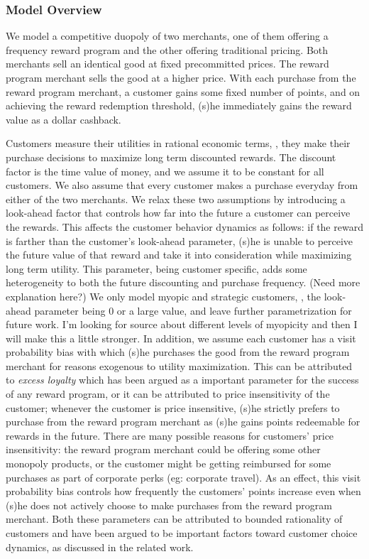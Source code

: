 \subsubsection{Model Overview}
We model a competitive duopoly of two merchants, one of them offering a frequency reward program and the other offering traditional pricing.
Both merchants sell an identical good at fixed precommitted prices.
The reward program merchant sells the good at a higher price.
With each purchase from the reward program merchant, a customer gains some fixed number of points, and on achieving the reward redemption threshold, (s)he immediately gains the reward value as a dollar cashback.

Customers measure their utilities in rational economic terms, \ie, they make their purchase decisions to maximize long term discounted rewards.
The discount factor is the time value of money, and we assume it to be constant for all customers.
We also assume that every customer makes a purchase everyday from either of the two merchants.
We relax these two assumptions by introducing a look-ahead factor that controls how far into the future a customer can perceive the rewards. 
This affects the customer behavior dynamics as follows: if the reward is farther than the customer's look-ahead parameter, (s)he is unable to perceive the future value of that reward and take it into consideration while maximizing long term utility.
{\arpit This parameter, being customer specific, adds some heterogeneity to both the future discounting and purchase frequency. (Need more explanation here?)}
We only model myopic and strategic customers, \ie, the look-ahead parameter being $0$ or a large value, and leave further parametrization for future work. {\nolan I'm looking for source about different levels of myopicity and then I will make this a little stronger.}
In addition, we assume each customer has a visit probability bias with which (s)he purchases the good from the reward program merchant for reasons exogenous to utility maximization.
This can be attributed to \emph{excess loyalty} which has been argued as a important parameter for the success of any reward program, or it can be attributed to price insensitivity of the customer; whenever the customer is price insensitive, (s)he strictly prefers to purchase from the reward program merchant as (s)he gains points redeemable for rewards in the future.
There are many possible reasons for customers' price insensitivity: the reward program merchant could be offering some other monopoly products, or the customer might be getting reimbursed for some purchases as part of corporate perks (eg: corporate travel).
As an effect, this visit probability bias controls how frequently the customers' points increase even when (s)he does not actively choose to make purchases from the reward program merchant.
Both these parameters can be attributed to bounded rationality of customers and have been argued to be important factors toward customer choice dynamics, as discussed in the related work.


